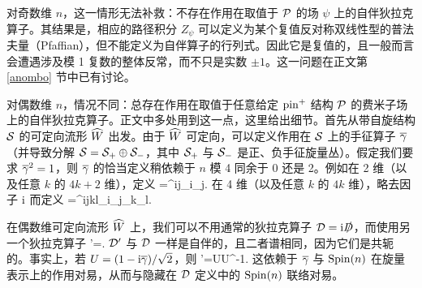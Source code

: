 对奇数维 $n$，这一情形无法补救：不存在作用在取值于 $\P$ 的场 $\psi$ 上的自伴狄拉克算子。其结果是，相应的路径积分 $Z_\psi$ 可以定义为某个复值反对称双线性型的普法夫量（Pfaffian），但不能定义为自伴算子的行列式。因此它是复值的，且一般而言会遭遇涉及模 1 复数的整体反常，而不只是实数 $\pm 1$。这一问题在正文第 \ref{anombo} 节中已有讨论。


对偶数维 $n$，情况不同：总存在作用在取值于任意给定 $\pin^+$ 结构 $\P$ 的费米子场上的自伴狄拉克算子。正文中多处用到这一点，这里给出细节。首先从带自旋结构 $\S$ 的可定向流形 $\h W$ 出发。由于 $\h W$ 可定向，可以定义作用在 $\S$ 上的手征算子 $\bg$（并导致分解 $\S=\S_+\oplus \S_-$，其中 $\S_+$ 与 $\S_-$ 是正、负手征旋量丛）。假定我们要求 $\bg^2=1$，则 $\bg$ 的恰当定义稍依赖于 $n$ 模 4 同余于 0 还是 2。例如在 2 维（以及任意 $k$ 的 $4k+2$ 维），定义
\be\label{toroz}\bg=\epsilon^{ij}\g_i\g_j. \ee
在 4 维（以及任意 $k$ 的 $4k$ 维），略去因子 $\i$ 而定义
\be\label{orz}\bg=\epsilon^{ijkl}\g_i\g_j\g_k\g_l. \ee


在偶数维可定向流形 $\h W$ 上，我们可以不用通常的狄拉克算子 $\D=\i\slashed{D}$，而使用另一个狄拉克算子
\be\label{elf} \D'=\bg {}. \ee
$\D'$ 与 $\D$ 一样是自伴的，且二者谱相同，因为它们是共轭的。事实上，若 $U=(1-\i\bg)/\sqrt 2$，则
\be\label{welf}\D'=U\D U^{-1}.\ee
这依赖于 $\bg$ 与 $\Spin(n)$ 在旋量表示上的作用对易，从而与隐藏在 $\D$ 定义中的 $\Spin(n)$ 联络对易。


